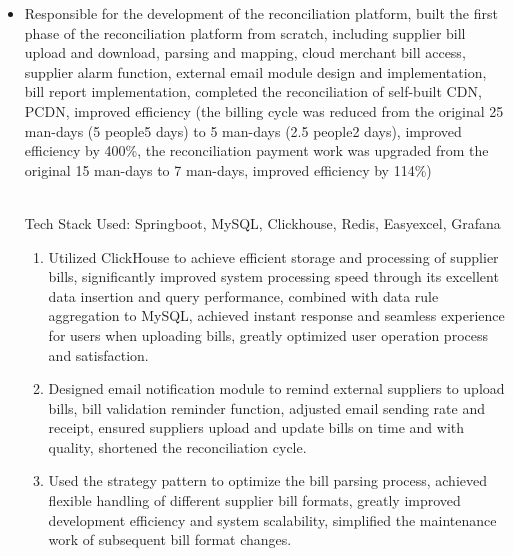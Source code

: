 \documentclass{resume}
\newcommand{\en}[1]{#1}
\newcommand{\zh}[1]{}
\begin{document}
\begin{itemize}
      \item \en{Responsible for the development of the reconciliation platform, built the first phase of the reconciliation platform from scratch, including supplier bill upload and download, parsing and mapping, cloud merchant bill access, supplier alarm function, external email module design and implementation, bill report implementation, completed the reconciliation of self-built CDN, PCDN, improved efficiency (the billing cycle was reduced from the original 25 man-days (5 people5 days) to 5 man-days (2.5 people2 days), improved efficiency by 400\%, the reconciliation payment work was upgraded from the original 15 man-days to 7 man-days, improved efficiency by 114\%)}
            \zh{负责对账平台的研发工作，从零到一搭建了对账平台1期，包括供应商账单的上传与下载，解析与映射，云商账单的接入，供应商告警功能，对外邮件模块的设计与实现，账单报表的实现，完成了自建CDN、PCDN的对账，提升人效（结账周期由原来的25人天（5人5天），缩减至5人天（2.5人2天），提效400\%，对账付款工作由原来的15人天，提升至7人天，提效114\%）}
            \en{\\Tech Stack Used: Springboot, MySQL, Clickhouse, Redis, Easyexcel, Grafana}
            \zh{\\使用的技术栈: springboot, mysql, clickhouse, redis, easyexcel, grafana}
            \begin{enumerate}
                  \item \en{Utilized ClickHouse to achieve efficient storage and processing of supplier bills, significantly improved system processing speed through its excellent data insertion and query performance, combined with data rule aggregation to MySQL, achieved instant response and seamless experience for users when uploading bills, greatly optimized user operation process and satisfaction.}
                        \zh{利用ClickHouse实现供应商账单的高效存储与处理，通过其卓越的数据插入和查询性能，配合数据规则聚合至MySQL，显著提高了系统处理速度，实现了用户在上传账单时的即时响应和无感知体验，极大优化了用户操作流程和满意度}
                  \item \en{Designed email notification module to remind external suppliers to upload bills, bill validation reminder function, adjusted email sending rate and receipt, ensured suppliers upload and update bills on time and with quality, shortened the reconciliation cycle.}
                        \zh{设计邮件通知模块来提醒外部供应商上传账单，账单校验提醒功能，调整邮件发送速率与回执，确保供应商按时按质上传与更新账单，缩短了对账周期}
                  \item \en{Used the strategy pattern to optimize the bill parsing process, achieved flexible handling of different supplier bill formats, greatly improved development efficiency and system scalability, simplified the maintenance work of subsequent bill format changes.}
                        \zh{采用策略模式优化账单解析过程，实现了对不同供应商账单格式的灵活处理，极大提升了开发效率和系统的可扩展性，简化了后续账单格式变更的维护工作}
            \end{enumerate}
\end{itemize}
\end{document}
